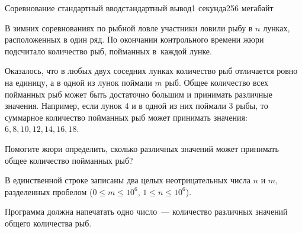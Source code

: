 \begin{problem}{Соревнование }{стандартный ввод}{стандартный вывод}{1 секунда}{256 мегабайт}

В зимних соревнованиях по рыбной ловле участники ловили рыбу в $n$ лунках, расположенных в один ряд. По окончании контрольного времени жюри подсчитало количество рыб, пойманных в~каждой лунке.

Оказалось, что в любых двух соседних лунках количество рыб отличается ровно на единицу, а в одной из лунок поймали $m$ рыб. Общее количество всех пойманных рыб может быть достаточно большим и принимать различные значения. Например, если лунок $4$ и в одной из них поймали $3$ рыбы, то суммарное количество пойманных рыб может принимать значения: $6, 8, 10, 12, 14, 16, 18$.

Помогите жюри определить, сколько различных значений может принимать общее количество пойманных рыб?

\InputFile
В единственной строке записаны два целых неотрицательных числа $n$ и $m$, разделенных пробелом ($0 \leq m \leq 10^6$, $1 \leq n \leq 10^6$).

\OutputFile
Программа должна напечатать одно число~--- количество различных значений общего количества рыб.

\Examples

\begin{example}
%
%
\end{example}

\end{problem}

